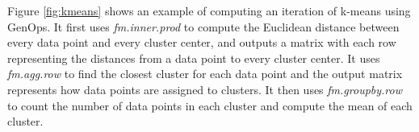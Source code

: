 Figure \ref{fig:kmeans} shows an example of computing an iteration of k-means
\cite{kmeans} using GenOps. It first uses \textit{fm.inner.prod} to
compute the Euclidean distance between every data point and every cluster center,
and outputs a matrix with each row representing the distances from a data
point to every cluster center. It uses \textit{fm.agg.row} to find the closest
cluster for each data point and the output matrix represents how data points
are assigned to clusters. It then uses \textit{fm.groupby.row} to count
the number of data points in each cluster and compute the mean of each cluster.





